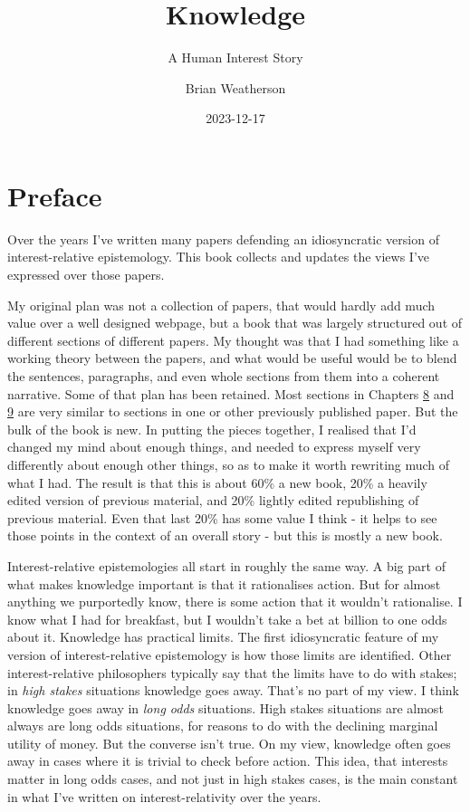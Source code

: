 \documentclass[
  12pt,
  letterpaper,
]{scrbook}
\title{Knowledge}
\subtitle{A Human Interest Story}
\author{Brian Weatherson}
\date{2023-12-17}
\renewcommand*\contentsname{Table of contents}
\newcommand\contentsname{Table of contents}
\begin{document}
\frontmatter
\maketitle

\renewcommand*\contentsname{Table of contents}
{
\hypersetup{linkcolor=}
\setcounter{tocdepth}{2}
\tableofcontents
}
\mainmatter
{}

\chapter*{Preface}\label{sec-preface}


Over the years I've written many papers defending an idiosyncratic
version of interest-relative epistemology. This book collects and
updates the views I've expressed over those papers.

My original plan was not a collection of papers, that would hardly add
much value over a well designed webpage, but a book that was largely
structured out of different sections of different papers. My thought was
that I had something like a working theory between the papers, and what
would be useful would be to blend the sentences, paragraphs, and even
whole sections from them into a coherent narrative. Some of that plan
has been retained. Most sections in Chapters \hyperref[sec-ratbel]{8}
and \hyperref[sec-evidence]{9} are very similar to sections in one or
other previously published paper. But the bulk of the book is new. In
putting the pieces together, I realised that I'd changed my mind about
enough things, and needed to express myself very differently about
enough other things, so as to make it worth rewriting much of what I
had. The result is that this is about 60\% a new book, 20\% a heavily
edited version of previous material, and 20\% lightly edited
republishing of previous material. Even that last 20\% has some value I
think - it helps to see those points in the context of an overall story
- but this is mostly a new book.

Interest-relative epistemologies all start in roughly the same way. A
big part of what makes knowledge important is that it rationalises
action. But for almost anything we purportedly know, there is some
action that it wouldn't rationalise. I know what I had for breakfast,
but I wouldn't take a bet at billion to one odds about it. Knowledge has
practical limits. The first idiosyncratic feature of my version of
interest-relative epistemology is how those limits are identified. Other
interest-relative philosophers typically say that the limits have to do
with stakes; in \emph{high stakes} situations knowledge goes away.
That's no part of my view. I think knowledge goes away in \emph{long
odds} situations. High stakes situations are almost always are long odds
situations, for reasons to do with the declining marginal utility of
money. But the converse isn't true. On my view, knowledge often goes
away in cases where it is trivial to check before action. This idea,
that interests matter in long odds cases, and not just in high stakes
cases, is the main constant in what I've written on interest-relativity
over the years.
\end{document}
